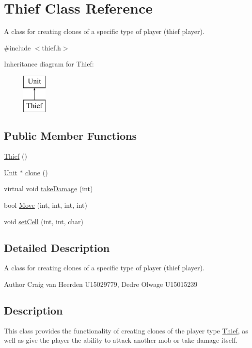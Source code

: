 \hypertarget{class_thief}{\section{\-Thief \-Class \-Reference}
\label{class_thief}
}


\-A class for creating clones of a specific type of player (thief player).  




{\ttfamily \#include $<$thief.\-h$>$}

\-Inheritance diagram for \-Thief\-:\begin{figure}[H]
\begin{center}
\leavevmode
\includegraphics[height=2.000000cm]{class_thief}
\end{center}
\end{figure}
\subsection*{\-Public \-Member \-Functions}
\begin{DoxyCompactItemize}
\item 
\hyperlink{class_thief_aa27752dd9c628bf41d297fedee59c2df}{\-Thief} ()
\item 
\hyperlink{class_unit}{\-Unit} $\ast$ \hyperlink{class_thief_af9de8403347ca5ee8431d5a0e20cc1bc}{clone} ()
\item 
virtual void \hyperlink{class_thief_a72790a2a46c3b7da0a67f49a5e3fc48a}{take\-Damage} (int)
\item 
bool \hyperlink{class_thief_ac7cc85c286ed17f16fc8f71b60b1628f}{\-Move} (int, int, int, int)
\item 
void \hyperlink{class_thief_afae64f04a0c969194ed40a933b4401b2}{set\-Cell} (int, int, char)
\end{DoxyCompactItemize}


\subsection{\-Detailed \-Description}
\-A class for creating clones of a specific type of player (thief player). 

\begin{DoxyAuthor}{\-Author}
\-Craig van \-Heerden \-U15029779, \-Dedre \-Olwage \-U15015239
\end{DoxyAuthor}
\hypertarget{class_unit_factory_Description}{}\subsection{\-Description}\label{class_unit_factory_Description}
\-This class provides the functionality of creating clones of the player type \hyperlink{class_thief}{\-Thief}, as well as give the player the ability to attack another mob or take damage itself. 

